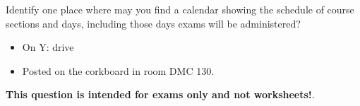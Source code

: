 

Identify one place where may you find a calendar showing the schedule of course sections and days, including those days exams will be administered?







\begin{itemize}
\item{} On Y: drive
\item{} Posted on the corkboard in room DMC 130.
\end{itemize}
 






{\bf This question is intended for exams only and not worksheets!}.



